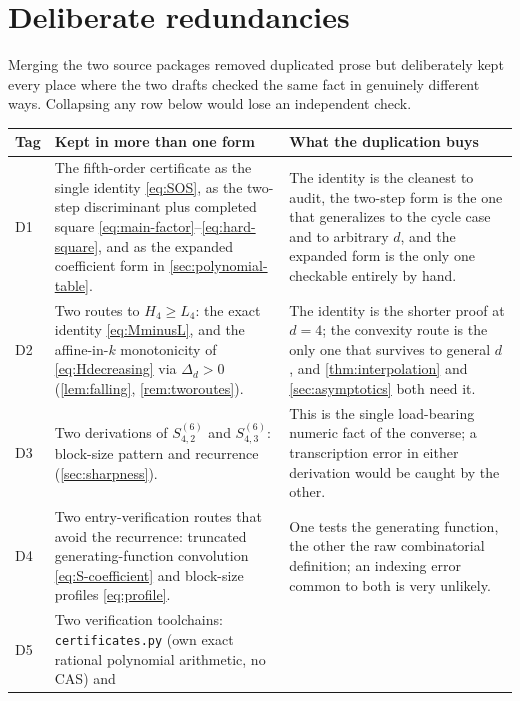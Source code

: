 \documentclass[11pt,a4paper]{article}
\numberwithin{equation}{section}
\theoremstyle{definition}
\theoremstyle{remark}
\begin{document}
\section{Deliberate redundancies}\label{sec:redundancy}

Merging the two source packages removed duplicated prose but deliberately
kept every place where the two drafts checked the same fact in genuinely
different ways. Collapsing any row below would lose an independent check.

\begin{center}
\small
\renewcommand{\arraystretch}{1.2}
\begin{longtable}{@{}>{\raggedright\arraybackslash}p{}
>{\raggedright\arraybackslash}p{}
>{\raggedright\arraybackslash}p{}@{}}
\toprule
Tag & Kept in more than one form & What the duplication buys\\
\midrule
\endhead
D1 & The fifth-order certificate as the single identity \eqref{eq:SOS}, as
the two-step discriminant plus completed square
\eqref{eq:main-factor}--\eqref{eq:hard-square}, and as the expanded
coefficient form in \cref{sec:polynomial-table}. &
The identity is the cleanest to audit, the two-step form is the one that
generalizes to the cycle case and to arbitrary $d$, and the expanded form
is the only one checkable entirely by hand.\\
D2 & Two routes to $H_4\ge L_4$: the exact identity \eqref{eq:MminusL},
and the affine-in-$k$ monotonicity of \eqref{eq:Hdecreasing} via
$\Delta_d>0$ (\cref{lem:falling}, \cref{rem:tworoutes}). &
The identity is the shorter proof at $d=4$; the convexity route is the
only one that survives to general $d$, and \cref{thm:interpolation} and
\cref{sec:asymptotics} both need it.\\
D3 & Two derivations of $S^{(6)}_{4,2}$ and $S^{(6)}_{4,3}$: block-size
pattern and recurrence (\cref{sec:sharpness}). &
This is the single load-bearing numeric fact of the converse; a
transcription error in either derivation would be caught by the other.\\
D4 & Two entry-verification routes that avoid the recurrence: truncated
generating-function convolution \eqref{eq:S-coefficient} and block-size
profiles \eqref{eq:profile}. &
One tests the generating function, the other the raw combinatorial
definition; an indexing error common to both is very unlikely.\\
D5 & Two verification toolchains: \texttt{certificates.py} (own exact
rational polynomial arithmetic, no CAS) and

\end{longtable}
\end{center}
\end{document}
